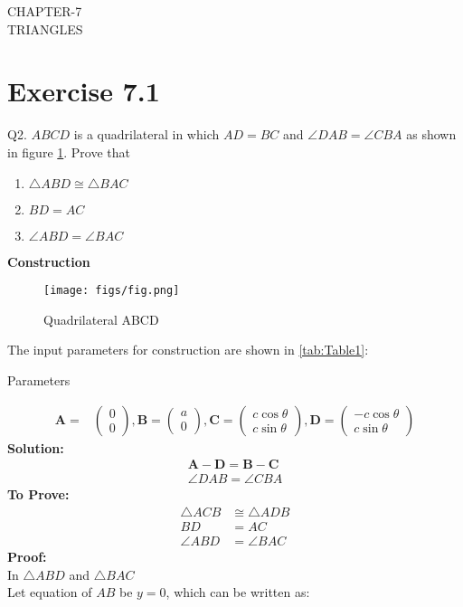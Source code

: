 \documentclass{article}
\newcommand{\solution}{\noindent \textbf{Solution: }}
\newcommand{\myvec}[1]{\ensuremath{\begin{pmatrix}#1\end{pmatrix}}}
\let\vec\mathbf
\begin{document}
\begin{center}
        \textbf\large{CHAPTER-7 \\ TRIANGLES}
\end{center}
\section{Exercise 7.1}
Q2. $ABCD$ is a quadrilateral in which $AD = BC$ and $\angle{DAB} = \angle{CBA}$ as shown in figure \ref{fig:Fig}. Prove that
\begin{enumerate}
\item $\triangle{ABD} \cong \triangle{BAC}$
  \item $BD = AC$
  \item $\angle{ABD} = \angle{BAC}$
\end{enumerate}
\textbf{Construction}\\
\begin{figure}[H]
	\begin{center}
		\texttt{[image: figs/fig.png]}
	\end{center}
	\caption{Quadrilateral ABCD}
	\label{fig:Fig}
\end{figure}
The input parameters for construction are shown in \ref{tab:Table1}:\\
\begin{table}[H]
    \centering
    
    \caption{Parameters}
    \label{tab:Table1}
\end{table}
\pagebreak
\begin{align}
\vec{A} =& \myvec{0\\0},\vec{B} = \myvec{a\\0},\vec{C} = \myvec{c\cos\theta\\c\sin\theta},\vec{D} = \myvec{-c\cos\theta\\c\sin\theta}
\end{align}
\solution
\begin{align}
	\vec{A}-\vec{D} = \vec{B}-\vec{C}\\
  \angle{DAB} = \angle{CBA}
\end{align}
\textbf{To Prove:}
  \begin{align}
	  \triangle{ACB} &\cong \triangle{ADB}\\
	  BD &= AC\\
	  \angle{ABD} &= \angle{BAC}
  \end{align}
\textbf{Proof:}\\
In $\triangle{ABD}$ and $\triangle{BAC}$\\
Let  equation of $AB$ be $y = 0$, which can be written as:
\end{document}
